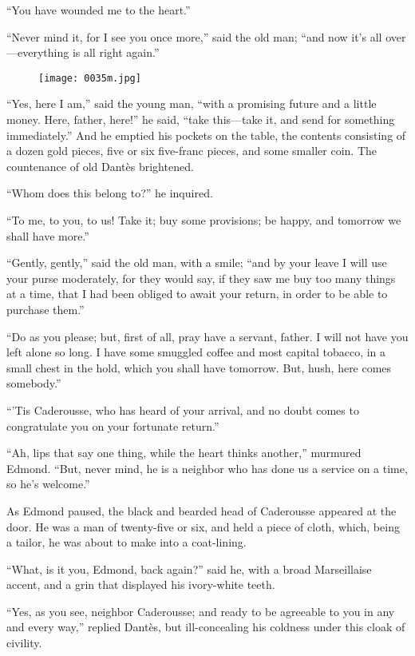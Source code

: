 “You have wounded me to the heart.”

“Never mind it, for I see you once more,” said the old man; “and now
it’s all over—everything is all right again.”

\begin{figure}[h]
\texttt{[image: 0035m.jpg]}
\end{figure}

“Yes, here I am,” said the young man, “with a promising future and a
little money. Here, father, here!” he said, “take this—take it, and
send for something immediately.” And he emptied his pockets on the
table, the contents consisting of a dozen gold pieces, five or six
five-franc pieces, and some smaller coin. The countenance of old Dantès
brightened.

“Whom does this belong to?” he inquired.

“To me, to you, to us! Take it; buy some provisions; be happy, and
tomorrow we shall have more.”

“Gently, gently,” said the old man, with a smile; “and by your leave I
will use your purse moderately, for they would say, if they saw me buy
too many things at a time, that I had been obliged to await your
return, in order to be able to purchase them.”

“Do as you please; but, first of all, pray have a servant, father. I
will not have you left alone so long. I have some smuggled coffee and
most capital tobacco, in a small chest in the hold, which you shall
have tomorrow. But, hush, here comes somebody.”

“’Tis Caderousse, who has heard of your arrival, and no doubt comes to
congratulate you on your fortunate return.”

“Ah, lips that say one thing, while the heart thinks another,” murmured
Edmond. “But, never mind, he is a neighbor who has done us a service on
a time, so he’s welcome.”

As Edmond paused, the black and bearded head of Caderousse appeared at
the door. He was a man of twenty-five or six, and held a piece of
cloth, which, being a tailor, he was about to make into a coat-lining.

“What, is it you, Edmond, back again?” said he, with a broad
Marseillaise accent, and a grin that displayed his ivory-white teeth.

“Yes, as you see, neighbor Caderousse; and ready to be agreeable to you
in any and every way,” replied Dantès, but ill-concealing his coldness
under this cloak of civility.

